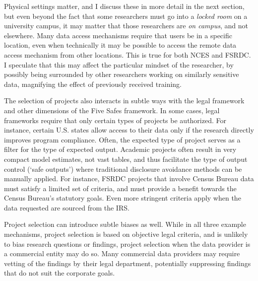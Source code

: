 Physical settings matter, and I discuss these in more detail in the next section, but even beyond the fact that some researchers must go into a \textit{locked room} on a university campus, it may matter that those researchers are \textit{on campus}, and not elsewhere. Many data access mechanisms require that users be in a specific location, even when technically it may be possible to access the remote data access mechanism from other locations. This is true for both NCES and FSRDC. I speculate that this  may affect the particular mindset of the researcher, by possibly being surrounded by other researchers working on similarly sensitive data, magnifying the effect of previously received training. 

The selection of projects also interacts in subtle ways with the legal framework and other dimensions of the Five Safes framework. In some cases, legal frameworks require that only certain types of projects be authorized. For instance, certain U.S. states allow access to their data only if the research directly improves program compliance. Often, the expected type of project serves as a filter for the type of expected output. Academic projects often result in very compact model estimates, not vast tables, and thus facilitate the type of output control (`safe outputs') where traditional disclosure avoidance methods can be manually applied. For instance, FSRDC projects that involve Census Bureau data must satisfy a limited set of criteria, and must provide a benefit towards the Census Bureau's statutory goals. Even more stringent criteria apply when the data requested are sourced from the \ac{IRS}.

Project selection can introduce subtle biases as well. While in all three example mechanisms, project selection is based on objective legal criteria, and is unlikely to bias research questions or findings, project selection when the data provider is a commercial entity may do so. Many commercial data providers may require vetting of the findings by their legal department, potentially suppressing findings that do not suit the corporate goals. 


